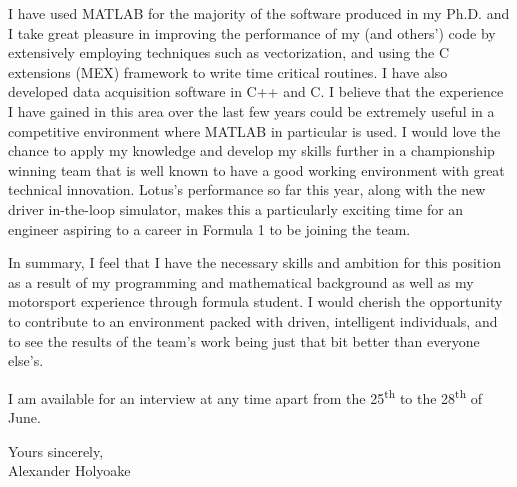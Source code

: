 \documentclass[a4paper,10pt]{article}
\begin{document}
I have used MATLAB for the majority of the software produced in my Ph.D. and I take great pleasure in improving the performance of my (and others') code by extensively employing techniques such as vectorization, and using the C extensions (MEX) framework to write time critical routines. I have also developed data acquisition software in C++ and C. I believe that the experience I have gained in this area over the last few years could be extremely useful in a competitive environment where MATLAB in particular is used. I would love the chance to apply my knowledge and develop my skills further in a championship winning team that is well known to have a good working environment with great technical innovation. Lotus's performance so far this year, along with the new driver in-the-loop simulator, makes this a particularly exciting time for an engineer aspiring to a career in Formula 1 to be joining the team. 

In summary, I feel that I have the necessary skills and ambition for this position as a result of my programming and mathematical background as well as my motorsport experience through formula student. I would cherish the opportunity to contribute to an environment packed with driven, intelligent individuals, and to see the results of the team's work being just that bit better than everyone else's.

I am available for an interview at any time apart from the 25\textsuperscript{th} to the 28\textsuperscript{th} of June.

\noindent
Yours sincerely,\\ 

Alexander Holyoake   
\end{document}
